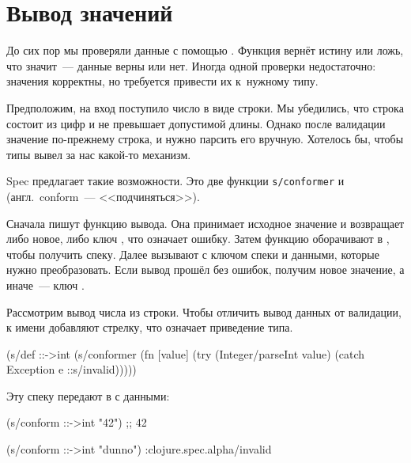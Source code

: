 \fi

\section{Вывод значений}

\label{spec-conform}


До сих пор мы проверяли данные с помощью . Функция вернёт истину
или ложь, что значит~--- данные верны или нет. Иногда одной проверки
недостаточно: значения корректны, но требуется привести их к~нужному типу.

Предположим, на вход поступило число в виде строки. Мы убедились, что строка
состоит из цифр и не превышает допустимой длины. Однако после валидации значение
по-прежнему строка, и нужно парсить его вручную. Хотелось бы, чтобы типы вывел
за нас какой-то механизм.


Spec предлагает такие возможности. Это две функции \texttt{s/con\-for\-mer}
и~ (англ.~con\-form~--- <<подчиняться>>).

\label{spec-invalid}



Сначала пишут функцию вывода. Она принимает исходное значение и возвращает либо
новое, либо ключ , что означает ошибку. Затем функцию
оборачивают в , чтобы получить спеку. Далее вызывают
 с ключом спеки и данными, которые нужно преобразовать. Если
вывод прошёл без ошибок, получим новое значение, а иначе~--- ключ
.

Рассмотрим вывод числа из строки. Чтобы отличить вывод данных от валидации, к
имени добавляют стрелку, что означает приведение типа.


\begin{clojure}
(s/def ::->int
  (s/conformer
   (fn [value]
     (try
       (Integer/parseInt value)
       (catch Exception e
         ::s/invalid)))))
\end{clojure}


\noindent
Эту спеку передают в  с данными:


\begin{clojure}
(s/conform ::->int "42") ;; 42

(s/conform ::->int "dunno")
:clojure.spec.alpha/invalid
\end{clojure}


